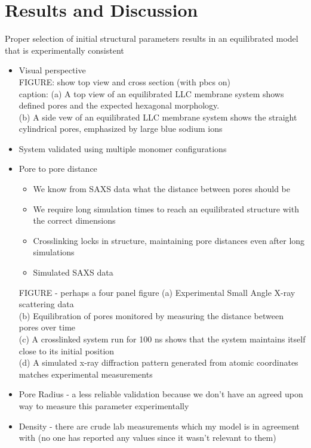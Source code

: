 \documentclass{article}
\begin{document}
	\section{Results and Discussion}
	
	Proper selection of initial structural parameters results in an equilibrated model that is experimentally consistent 
	\begin{itemize}
		\item Visual perspective \\
		FIGURE: show top view and cross section (with pbcs on)\\
		caption: (a) A top view of an equilibrated LLC membrane system shows defined pores and the expected hexagonal morphology. \\
		(b) A side vew of an equilibrated LLC membrane system shows the straight cylindrical pores, emphasized by large blue sodium ions 
		\item System validated using multiple monomer configurations 
		\item Pore to pore distance
		\begin{itemize}
			\item We know from SAXS data what the distance between pores should be
			\item We require long simulation times to reach an equilibrated structure with the correct dimensions
			\item Crosslinking locks in structure, maintaining pore distances even after long simulations
			\item Simulated SAXS data
		\end{itemize}
		FIGURE - perhaps a four panel figure
		(a) Experimental Small Angle X-ray scattering data \\
		(b) Equilibration of pores monitored by measuring the distance between pores over time \\
		(c) A crosslinked system run for 100 ns shows that the system maintains itself close to its initial position \\ 
		(d) A simulated x-ray diffraction pattern generated from atomic coordinates matches experimental measurements \\  	
		\item Pore Radius - a less reliable validation because we don't have an agreed upon way to measure this parameter experimentally
		\item Density - there are crude lab measurements which my model is in agreement with (no one has reported any values since it wasn't relevant to them)
	\end{itemize}
	
\end{document}
